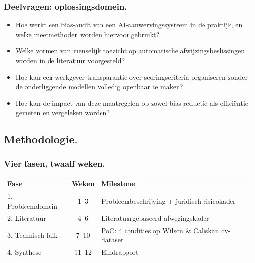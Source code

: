 \documentclass[aspectratio=169]{beamer}
\begin{document}
\begin{frame}
    \frametitle{Deelvragen: oplossingsdomein.}

    \begin{itemize}
        \item Hoe werkt een bias-audit van een AI-aanwervingssysteem in
            de praktijk, en welke meetmethoden worden hiervoor gebruikt?
        \item Welke vormen van menselijk toezicht op automatische
            afwijzingsbeslissingen worden in de literatuur voorgesteld?
        \item Hoe kan een werkgever transparantie over scoringscriteria
            organiseren zonder de onderliggende modellen volledig
            openbaar te maken?
        \item Hoe kan de impact van deze maatregelen op zowel
            bias-reductie als efficiëntie gemeten en vergeleken worden?
    \end{itemize}
\end{frame}

\subsection{Methodologie.}

\begin{frame}
    \frametitle{Vier fasen, twaalf weken.}

    \small
    \begin{table}
        \begin{tabular}{@{}lcp{5.8cm}@{}}
        \toprule
        \textbf{Fase} & \textbf{Weken} & \textbf{Milestone} \\
        \midrule
        1. Probleemdomein  & 1--3   & Probleembeschrijving + juridisch risicokader \\
        2. Literatuur       & 4--6   & Literatuurgebaseerd afwegingskader \\
        3. Technisch luik   & 7--10  & PoC: 4 condities op Wilson \& Caliskan cv-dataset \\
        4. Synthese         & 11--12 & Eindrapport \\
        \bottomrule
        \end{tabular}
    \end{table}
\end{frame}
\end{document}
